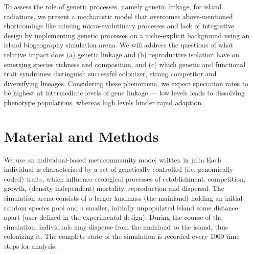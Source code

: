\documentclass[a4paper]{scrartcl}
\begin{document}


To assess the role of genetic processes, namely genetic linkage, for island radiations,
we present a mechanistic model that overcomes above-mentioned shortcomings like missing micro-evolutinary processes and lack of integrative design
by implementing genetic processes on a niche-explicit background
using an island biogeography simulation arena.
We will address the questions of what relative impact does (a) genetic linkage and
(b) reproductive isolation have on emerging species richness and composition,
and (c) which genetic and functional trait syndromes %
distinguish successful colonizer,
strong competitor and diversifying lineages.
Considering these phenomena, we expect speciation rates to be highest at intermediate levels of gene linkage --- low
levels leads to dissolving phenotype populations, whereas high levels hinder rapid adaption. %


\section{Material and Methods}
We use an individual-based metacommunity model written in julia %
Each individual is characterized by a set of genetically controlled (i.e. genomically-coded) traits,
which influence ecological processes of
establishment, competition, growth, (density independent) mortality, reproduction and dispersal.
The simulation arena consists of a larger landmass (the mainland) holding an initial random species pool and a smaller,
initially unpopulated island some distance apart (user-defined in the experimental design).
During the course of the simulation, individuals may disperse from the mainland to the island, thus colonizing it. 
The complete state of the simulation is recorded every 1000 time steps for analysis.
\end{document}
